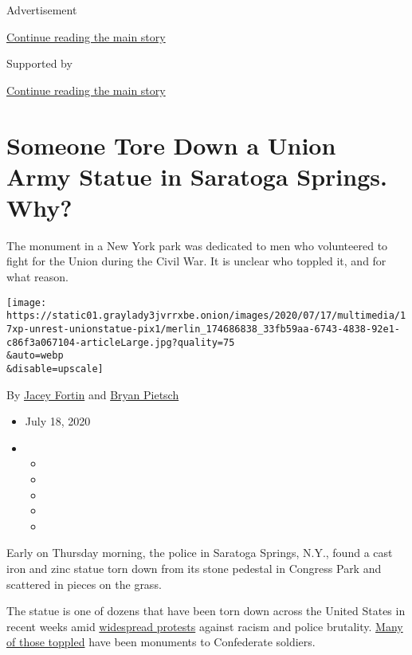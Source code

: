 Advertisement

\protect\hyperlink{after-top}{Continue reading the main story}

Supported by

\protect\hyperlink{after-sponsor}{Continue reading the main story}

\hypertarget{someone-tore-down-a-union-army-statue-in-saratoga-springs-why}{%
\section{Someone Tore Down a Union Army Statue in Saratoga Springs.
Why?}\label{someone-tore-down-a-union-army-statue-in-saratoga-springs-why}}

The monument in a New York park was dedicated to men who volunteered to
fight for the Union during the Civil War. It is unclear who toppled it,
and for what reason.

\texttt{[image: https://static01.graylady3jvrrxbe.onion/images/2020/07/17/multimedia/17xp-unrest-unionstatue-pix1/merlin\_174686838\_33fb59aa-6743-4838-92e1-c86f3a067104-articleLarge.jpg?quality=75\\\&auto=webp\\\&disable=upscale]}

By \href{https://www.nytimes3xbfgragh.onion/by/jacey-fortin}{Jacey
Fortin} and
\href{https://www.nytimes3xbfgragh.onion/by/bryan-pietsch}{Bryan
Pietsch}

\begin{itemize}
\item
  July 18, 2020
\item
  \begin{itemize}
  \item
  \item
  \item
  \item
  \item
  \end{itemize}
\end{itemize}

Early on Thursday morning, the police in Saratoga Springs, N.Y., found a
cast iron and zinc statue torn down from its stone pedestal in Congress
Park and scattered in pieces on the grass.

The statue is one of dozens that have been torn down across the United
States in recent weeks amid
\href{https://www.nytimes3xbfgragh.onion/interactive/2020/07/03/us/george-floyd-protests-crowd-size.html}{widespread
protests} against racism and police brutality.
\href{https://www.nytimes3xbfgragh.onion/2020/06/16/us/protests-statues-reckoning.html}{Many
of those toppled} have been monuments to Confederate soldiers.

